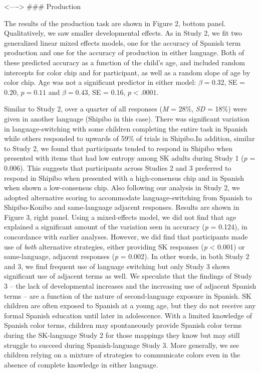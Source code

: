 \documentclass[
  english,
  ,man,floatsintext]{apa6}
\begin{document}
\textless----\textgreater{}
\#\#\# Production

The results of the production task are shown in Figure 2, bottom panel. Qualitatively, we saw smaller developmental effects. As in Study 2, we fit two generalized linear mixed effects models, one for the accuracy of Spanish term production and one for the accuracy of production in either language. Both of these predicted accuracy as a function of the child's age, and included random intercepts for color chip and for participant, as well as a random slope of age by color chip. Age was not a significant predictor in either model: \(\beta = 0.32\), SE = 0.20, \(p = 0.11\) and \(\beta = 0.43\), SE = 0.16, \(p < .0001\).

Similar to Study 2, over a quarter of all responses (\emph{M} = 28\%, \emph{SD} = 18\%) were given in another language (Shipibo in this case). There was significant variation in language-switching with some children completing the entire task in Spanish while others responded to upwards of 59\% of trials in Shipibo.In addition, similar to Study 2, we found that participants tended to respond in Shipibo when presented with items that had low entropy among SK adults during Study 1 (\(p\) = 0.006). This suggests that participants across Studies 2 and 3 preferred to respond in Shipibo when presented with a high-consensus chip and in Spanish when shown a low-consensus chip.
Also following our analysis in Study 2, we adopted alternative scoring to accommodate language-switching from Spanish to Shipibo-Konibo and same-language adjacent responses. Results are shown in Figure 3, right panel. Using a mixed-effects model, we did not find that age explained a significant amount of the variation seen in accuracy (\emph{p} = 0.124), in concordance with earlier analyses. However, we did find that participants made use of \emph{both} alternative strategies, either providing SK responses (\emph{p} \textless{} 0.001) or same-language, adjacent responses (\emph{p} = 0.002). In other words, in both Study 2 and 3, we find frequent use of language switching but only Study 3 shows significant use of adjacent terms as well.
We speculate that the findings of Study 3 -- the lack of developmental increases and the increasing use of adjacent Spanish terms -- are a function of the nature of second-language exposure in Spanish. SK children are often exposed to Spanish at a young age, but they do not receive any formal Spanish education until later in adolescence. With a limited knowledge of Spanish color terms, children may spontaneously provide Spanish color terms during the SK-language Study 2 for those mappings they know but may still struggle to succeed during Spanish-language Study 3. More generally, we see children relying on a mixture of strategies to communicate colors even in the absence of complete knowledge in either language.
\end{document}
